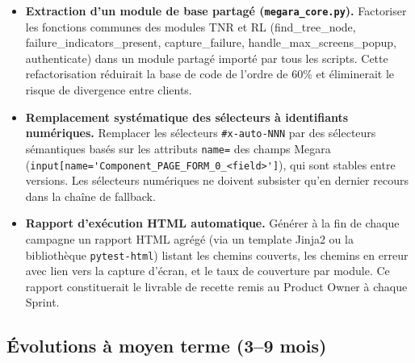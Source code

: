 \documentclass[12pt, a4paper]{report}
\begin{document}
\begin{itemize}[itemsep=3pt]

  \item \textbf{Extraction d'un module de base partagé (\texttt{megara\_core.py}).}
  Factoriser les fonctions communes des modules TNR et RL (find\_tree\_node, failure\_indicators\_present, capture\_failure, handle\_max\_screens\_popup, authenticate) dans un module partagé importé par tous les scripts. Cette refactorisation réduirait la base de code de l'ordre de 60\% et éliminerait le risque de divergence entre clients.

  \item \textbf{Remplacement systématique des sélecteurs à identifiants numériques.}
  Remplacer les sélecteurs \texttt{\#x-auto-NNN} par des sélecteurs sémantiques basés sur les attributs \texttt{name=} des champs Megara (\nolinkurl{input[name='Component_PAGE_FORM_0_<field>']}), qui sont stables entre versions. Les sélecteurs numériques ne doivent subsister qu'en dernier recours dans la chaîne de fallback.

  \item \textbf{Rapport d'exécution HTML automatique.}
  Générer à la fin de chaque campagne un rapport HTML agrégé (via un template Jinja2 ou la bibliothèque \texttt{pytest-html}) listant les chemins couverts, les chemins en erreur avec lien vers la capture d'écran, et le taux de couverture par module. Ce rapport constituerait le livrable de recette remis au Product Owner à chaque Sprint.

\end{itemize}

\subsection*{Évolutions à moyen terme (3–9 mois)}
\end{document}

